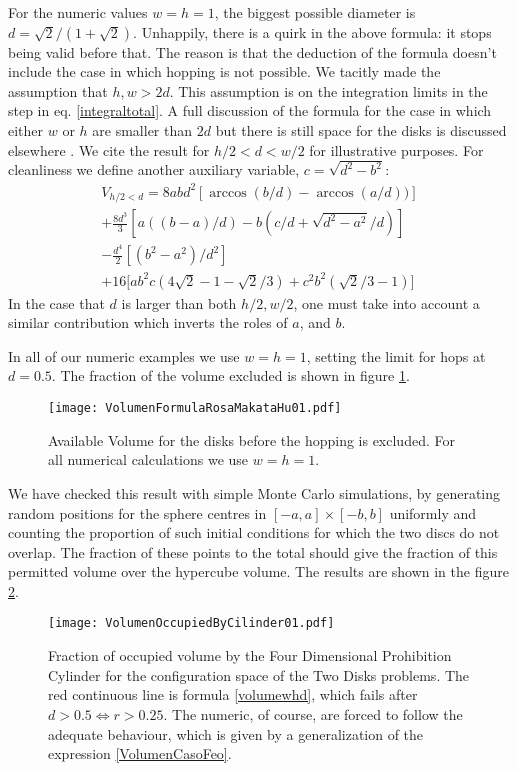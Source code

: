 \documentclass[a4paper,10pt, jcp, aps, preprint]{revtex4-1}
\begin{document}
For the numeric values $w=h=1$, the biggest possible diameter is 
$d=\sqrt{2}/(1+\sqrt{2})$. Unhappily, there is a quirk in the above formula:
it stops being valid before that. The reason is that the deduction
of the formula doesn't include the case in which hopping is not possible. 
We tacitly made the assumption that $h,w>2d$.  This assumption is on 
the integration limits in the step in eq. \ref{integraltotal}. 
A full discussion of the formula for the case in which either
$w$ or $h$ are smaller than $2d$ but there is still space for
the disks is discussed elsewhere \cite{notascalculokarel}. 
We cite the  result for $h/2  <d< w/2$ for illustrative purposes.
For cleanliness we define another auxiliary variable,
$c=\sqrt{d^2-b^2}$:
\begin{multline}\label{VolumenCasoFeo}
V_{h/2<d} = 8abd^2[\arccos(b/d)-\arccos(a/d))]\\
+\frac{8 d^3}{3 }[a((b-a)/d)-b(c/d+\sqrt{d^2-a^2}/d)]\\
-\frac{d^4}{2} [ (b^2-a^2)/d^2]\\ 
+16[ a b^2 c (4\sqrt{2}-1-\sqrt{2}/3)
+c^2b^2 (\sqrt{2}/3-1) \big]
\end{multline}
In the case that $d$ is larger than both $h/2, w/2$, one must take
into account a similar
contribution which inverts the roles of $a$, and $b$.

In all of our numeric examples we use $w=h=1$, setting the
limit for hops at $d=0.5$. The fraction of the volume
excluded is shown in
figure  \ref{VolFRM}.

\begin{figure}
\centering
\texttt{[image: VolumenFormulaRosaMakataHu01.pdf]}
\caption{Available Volume for the disks before the hopping
is excluded. For all numerical calculations we use $w=h=1$.}
\label{VolFRM}
\end{figure}


We have checked this result with simple Monte Carlo simulations, 
by generating random positions for the sphere centres in 
$[-a,a] \times [-b,b]$ uniformly and 
counting the proportion of such initial conditions for 
which the two discs do not overlap. The fraction of these points to the 
total should give the fraction of this permitted volume over the hypercube
volume. The results are shown in the figure \ref{VolMonteC}.

\begin{figure}
\centering
\texttt{[image: VolumenOccupiedByCilinder01.pdf]}
\caption{Fraction of occupied volume by the 
Four Dimensional Prohibition Cylinder for the configuration space of the 
Two Disks problems. The red continuous line is formula \ref{volumewhd}, 
which fails after $d>0.5\Leftrightarrow r>0.25$. The numeric,
of course, are forced to follow the adequate behaviour, which is given
by a generalization of the expression \ref{VolumenCasoFeo}. 
 }\label{VolMonteC}
\end{figure}
\end{document}
